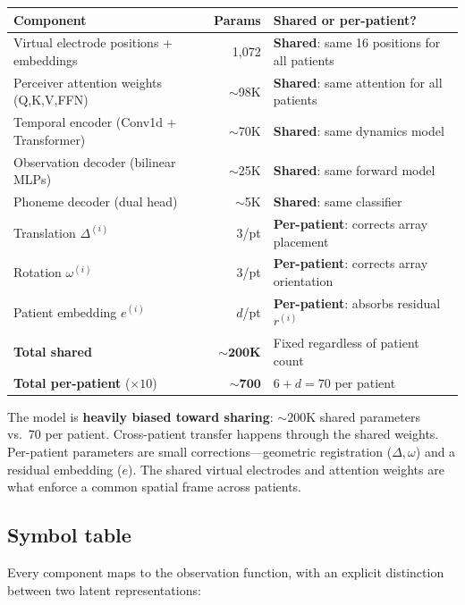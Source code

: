 \documentclass[11pt,letterpaper]{article}
\begin{document}
\begin{table}[ht!]\centering\small
\begin{tabular}{@{}p{}rp{}@{}}
\toprule
\textbf{Component} & \textbf{Params} & \textbf{Shared or per-patient?} \\
\midrule
Virtual electrode positions + embeddings & 1,072 & \textbf{Shared}: same 16 positions for all patients \\
Perceiver attention weights (Q,K,V,FFN) & ${\sim}$98K & \textbf{Shared}: same attention for all patients \\
Temporal encoder (Conv1d + Transformer) & ${\sim}$70K & \textbf{Shared}: same dynamics model \\
Observation decoder (bilinear MLPs) & ${\sim}$25K & \textbf{Shared}: same forward model \\
Phoneme decoder (dual head) & ${\sim}$5K & \textbf{Shared}: same classifier \\
\midrule
Translation $\Delta^{(i)}$ & 3/pt & \textbf{Per-patient}: corrects array placement \\
Rotation $\omega^{(i)}$ & 3/pt & \textbf{Per-patient}: corrects array orientation \\
Patient embedding $e^{(i)}$ & $d$/pt & \textbf{Per-patient}: absorbs residual $r^{(i)}$ \\
\midrule
\textbf{Total shared} & $\mathbf{{\sim}200}$\textbf{K} & Fixed regardless of patient count \\
\textbf{Total per-patient} ($\times 10$) & $\mathbf{{\sim}700}$ & $6 + d = 70$ per patient \\
\bottomrule
\end{tabular}
\end{table}

\noindent The model is \textbf{heavily biased toward sharing}: ${\sim}200$K shared parameters vs.\ 70 per patient. Cross-patient transfer happens through the shared weights. Per-patient parameters are small corrections---geometric registration ($\Delta, \omega$) and a residual embedding ($e$). The shared virtual electrodes and attention weights are what enforce a common spatial frame across patients.

\subsection{Symbol table}

Every component maps to the observation function, with an explicit distinction between two latent representations:
\end{document}
